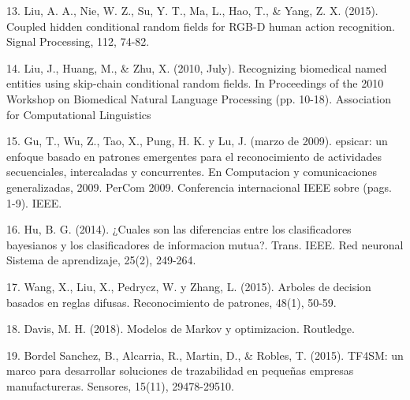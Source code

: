 \documentclass{paper}
\begin{document}
\bigskip
\bigskip


13. Liu, A. A., Nie, W. Z., Su, Y. T., Ma, L., Hao, T., & Yang, Z. X. (2015). Coupled hidden conditional random fields for RGB-D human action recognition. Signal Processing, 112, 74-82.

\bigskip
\bigskip


14. Liu, J., Huang, M., & Zhu, X. (2010, July). Recognizing biomedical named entities using skip-chain conditional random fields. In Proceedings of the 2010 Workshop on
Biomedical Natural Language Processing (pp. 10-18). Association for Computational Linguistics

\bigskip
\bigskip



15. Gu, T., Wu, Z., Tao, X., Pung, H. K. y Lu, J. (marzo de 2009). epsicar: un enfoque basado en patrones emergentes para el reconocimiento de actividades secuenciales, intercaladas y concurrentes. En
Computacion y comunicaciones generalizadas, 2009. PerCom 2009. Conferencia internacional IEEE sobre (pags. 1-9). IEEE.

\bigskip
\bigskip


16. Hu, B. G. (2014). ¿Cuales son las diferencias entre los clasificadores bayesianos y los clasificadores de informacion mutua?. Trans. IEEE. Red neuronal Sistema de aprendizaje, 25(2), 249-264.

\bigskip
\bigskip

17. Wang, X., Liu, X., Pedrycz, W. y Zhang, L. (2015). Arboles de decision basados en reglas difusas. Reconocimiento de patrones, 48(1), 50-59.

\bigskip
\bigskip

18. Davis, M. H. (2018). Modelos de Markov y optimizacion. Routledge.

\bigskip
\bigskip

19. Bordel Sanchez, B., Alcarria, R., Martin, D., & Robles, T. (2015). TF4SM: un marco para desarrollar soluciones de trazabilidad en pequeñas empresas manufactureras. Sensores, 15(11), 29478-29510.
\end{document}
